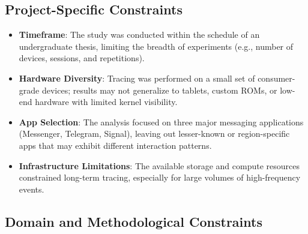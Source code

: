 \documentclass[a4paper,12pt]{report}
\begin{document}
\subsection*{Project-Specific Constraints}

\begin{itemize}
\item \textbf{Timeframe}: The study was conducted within the schedule of an undergraduate thesis, limiting the breadth of experiments (e.g., number of devices, sessions, and repetitions).
\item \textbf{Hardware Diversity}: Tracing was performed on a small set of consumer-grade devices; results may not generalize to tablets, custom ROMs, or low-end hardware with limited kernel visibility.
\item \textbf{App Selection}: The analysis focused on three major messaging applications (Messenger, Telegram, Signal), leaving out lesser-known or region-specific apps that may exhibit different interaction patterns.
\item \textbf{Infrastructure Limitations}: The available storage and compute resources constrained long-term tracing, especially for large volumes of high-frequency events.
\end{itemize}

\subsection*{Domain and Methodological Constraints}
\end{document}
